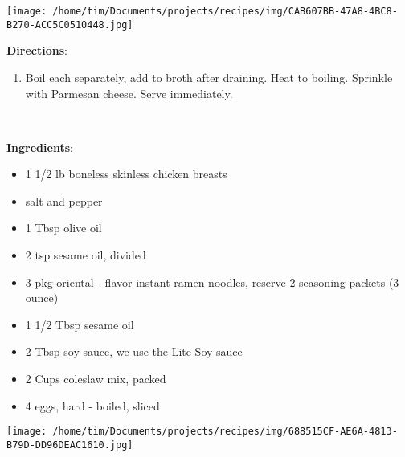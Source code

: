 \documentclass[11pt, twoside, openany]{book}
\begin{document}
\begin{minipage}[t]{0.2\linewidth}
\centering \strut\vspace*{-\baselineskip}\newline
\texttt{[image: /home/tim/Documents/projects/recipes/img/CAB607BB-47A8-4BC8-B270-ACC5C0510448.jpg]}\\
\end{minipage}\vspace{3mm}
\textbf{Directions}:
\vspace{-3mm}\begin{enumerate}\setlength\itemsep{-1mm}
\item Boil each separately, add to broth after draining. Heat to boiling. Sprinkle with Parmesan cheese. Serve immediately.
\end{enumerate}
 \label{chicken-lo-mein}\hfill\textit{}\\
\begin{minipage}[t]{0.8\linewidth}
\textbf{Ingredients}:\vspace{-3mm}
\begin{multicols}{2}
\begin{itemize}\setlength\itemsep{-1mm}
\item 1 1/2 lb boneless skinless chicken breasts
\item salt and pepper
\item 1 Tbsp olive oil
\item 2 tsp sesame oil, divided
\item 3 pkg oriental - flavor instant ramen noodles, reserve 2 seasoning packets (3 ounce)
\item 1 1/2 Tbsp sesame oil
\item 2 Tbsp soy sauce, we use the Lite Soy sauce
\item 2 Cups coleslaw mix, packed
\item 4 eggs, hard - boiled, sliced
\end{itemize}
\end{multicols}
\end{minipage}
\begin{minipage}[t]{0.2\linewidth}
\centering \strut\vspace*{-\baselineskip}\newline
\texttt{[image: /home/tim/Documents/projects/recipes/img/688515CF-AE6A-4813-B79D-DD96DEAC1610.jpg]}\\
\end{minipage}\vspace{3mm}
\end{document}
